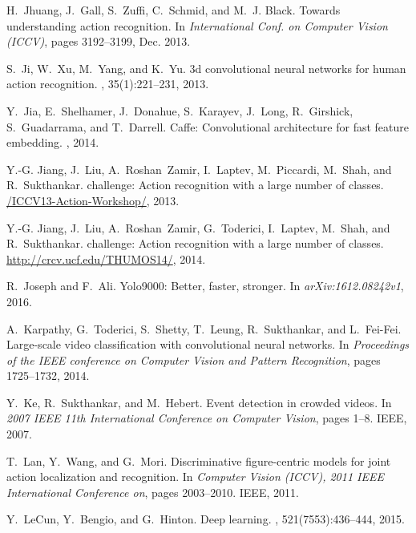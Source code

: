 \documentclass[10pt,twocolumn,letterpaper]{article}
\begin{document}
{\begin{thebibliography}{10}
H.~Jhuang, J.~Gall, S.~Zuffi, C.~Schmid, and M.~J. Black.
\newblock Towards understanding action recognition.
\newblock In {\em International Conf. on Computer Vision (ICCV)}, pages
  3192--3199, Dec. 2013.

S.~Ji, W.~Xu, M.~Yang, and K.~Yu.
\newblock 3d convolutional neural networks for human action recognition.
,
  35(1):221--231, 2013.

Y.~Jia, E.~Shelhamer, J.~Donahue, S.~Karayev, J.~Long, R.~Girshick,
  S.~Guadarrama, and T.~Darrell.
\newblock Caffe: Convolutional architecture for fast feature embedding.
, 2014.

Y.-G. Jiang, J.~Liu, A.~Roshan~Zamir, I.~Laptev, M.~Piccardi, M.~Shah, and
  R.~Sukthankar.
 challenge: Action recognition with a large number of
  classes.
\newblock \url{/ICCV13-Action-Workshop/}, 2013.

Y.-G. Jiang, J.~Liu, A.~Roshan~Zamir, G.~Toderici, I.~Laptev, M.~Shah, and
  R.~Sukthankar.
 challenge: Action recognition with a large number of
  classes.
\newblock \url{http://crcv.ucf.edu/THUMOS14/}, 2014.

R.~Joseph and F.~Ali.
\newblock Yolo9000: Better, faster, stronger.
\newblock In {\em arXiv:1612.08242v1}, 2016.

A.~Karpathy, G.~Toderici, S.~Shetty, T.~Leung, R.~Sukthankar, and L.~Fei-Fei.
\newblock Large-scale video classification with convolutional neural networks.
\newblock In {\em Proceedings of the IEEE conference on Computer Vision and
  Pattern Recognition}, pages 1725--1732, 2014.

Y.~Ke, R.~Sukthankar, and M.~Hebert.
\newblock Event detection in crowded videos.
\newblock In {\em 2007 IEEE 11th International Conference on Computer Vision},
  pages 1--8. IEEE, 2007.

T.~Lan, Y.~Wang, and G.~Mori.
\newblock Discriminative figure-centric models for joint action localization
  and recognition.
\newblock In {\em Computer Vision (ICCV), 2011 IEEE International Conference
  on}, pages 2003--2010. IEEE, 2011.

Y.~LeCun, Y.~Bengio, and G.~Hinton.
\newblock Deep learning.
, 521(7553):436--444, 2015.


\end{thebibliography}}
\end{document}
